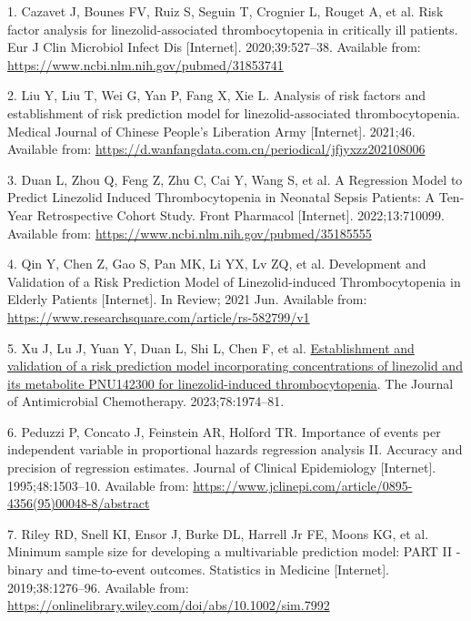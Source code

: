 \documentclass[
  letterpaper,
  DIV=11,
  numbers=noendperiod]{scrartcl}
\newlength{\cslhangindent}
\newenvironment{CSLReferences}[2] %
 {\begin{list}{}{%
  \setlength{\itemindent}{0pt}
  \setlength{\leftmargin}{0pt}
  \setlength{\parsep}{0pt}
  \ifodd #1
   \setlength{\leftmargin}{\cslhangindent}
   \setlength{\itemindent}{-1\cslhangindent}
  \fi
  \setlength{\itemsep}{#2\baselineskip}}}
 {\end{list}}
\begin{document}
\label{refs}
\begin{CSLReferences}{0}{1}
1. Cazavet J, Bounes FV, Ruiz S, Seguin T, Crognier L, Rouget A, et al.
Risk factor analysis for linezolid-associated thrombocytopenia in
critically ill patients. Eur J Clin Microbiol Infect Dis {[}Internet{]}.
2020;39:527--38. Available from:
\url{https://www.ncbi.nlm.nih.gov/pubmed/31853741}

2. Liu Y, Liu T, Wei G, Yan P, Fang X, Xie L. Analysis of risk factors
and establishment of risk prediction model for linezolid-associated
thrombocytopenia. Medical Journal of Chinese People's Liberation Army
{[}Internet{]}. 2021;46. Available from:
\url{https://d.wanfangdata.com.cn/periodical/jfjyxzz202108006}

3. Duan L, Zhou Q, Feng Z, Zhu C, Cai Y, Wang S, et al. A {Regression}
{Model} to {Predict} {Linezolid} {Induced} {Thrombocytopenia} in
{Neonatal} {Sepsis} {Patients}: {A} {Ten}-{Year} {Retrospective}
{Cohort} {Study}. Front Pharmacol {[}Internet{]}. 2022;13:710099.
Available from: \url{https://www.ncbi.nlm.nih.gov/pubmed/35185555}

4. Qin Y, Chen Z, Gao S, Pan MK, Li YX, Lv ZQ, et al. Development and
{Validation} of a {Risk} {Prediction} {Model} of {Linezolid}-induced
{Thrombocytopenia} in {Elderly} {Patients} {[}Internet{]}. In Review;
2021 Jun. Available from:
\url{https://www.researchsquare.com/article/rs-582799/v1}

5. Xu J, Lu J, Yuan Y, Duan L, Shi L, Chen F, et al.
\href{https://doi.org/10.1093/jac/dkad191}{Establishment and validation
of a risk prediction model incorporating concentrations of linezolid and
its metabolite {PNU142300} for linezolid-induced thrombocytopenia}. The
Journal of Antimicrobial Chemotherapy. 2023;78:1974--81.

6. Peduzzi P, Concato J, Feinstein AR, Holford TR. Importance of events
per independent variable in proportional hazards regression analysis II.
Accuracy and precision of regression estimates. Journal of Clinical
Epidemiology {[}Internet{]}. 1995;48:1503--10. Available from:
\url{https://www.jclinepi.com/article/0895-4356(95)00048-8/abstract}

7. Riley RD, Snell KI, Ensor J, Burke DL, Harrell Jr FE, Moons KG, et
al. Minimum sample size for developing a multivariable prediction model:
PART II - binary and time-to-event outcomes. Statistics in Medicine
{[}Internet{]}. 2019;38:1276--96. Available from:
\url{https://onlinelibrary.wiley.com/doi/abs/10.1002/sim.7992}


\end{CSLReferences}
\end{document}
